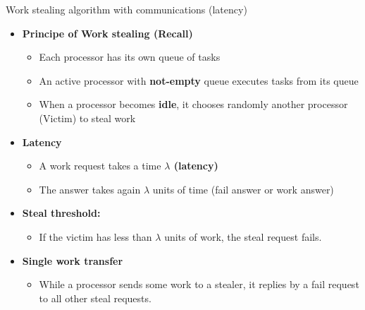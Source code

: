 \documentclass{beamer}
\begin{document}
\begin{frame}{Work stealing algorithm with communications (latency)}
    \begin{itemize}
        \item \textbf{Principe of Work stealing (Recall)} 
            \begin{itemize}
                \item Each processor has its own queue of tasks
                \item An active processor with \textbf{not-empty} queue executes tasks from its queue
                \item When a processor becomes \textbf{idle}, it chooses randomly another processor (Victim) to steal work
            \end{itemize}
                
        \item \textbf{Latency }   
            \begin{itemize}
                \item A work request takes a time \textbf{$\lambda$ (latency)}
                \item The answer takes again $\lambda$ units of time (fail answer or work answer)
            \end{itemize}
        \item \textbf{Steal threshold:}
            \begin{itemize}
                \item If the victim has less than $\lambda$ units of work, the steal request fails.
            \end{itemize}
            
        \item \textbf{Single work transfer}
            \begin{itemize}
                \item While a processor sends some work to a stealer, it replies by a fail request to all other steal requests. 
            \end{itemize}
    \end{itemize}
\end{frame}
\end{document}
